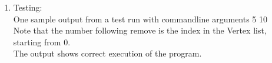 \documentclass{article}
\begin{document}
	\begin{enumerate}
		\item
		Testing:\\
		One sample output from a test run with commandline arguments 5 10\\
		
		Note that the number following remove is the index in the Vertex list, starting from 0.\\
		The output shows correct execution of the program.\\
	\end{enumerate}
\end{document}
